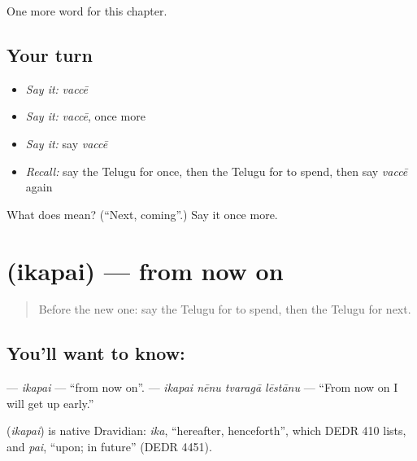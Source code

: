 \begin{grammarlens}[title={What you've built}]
One more word for this chapter.
\end{grammarlens}

\subsection*{Your turn}
\begin{itemize}
\raggedright
  \item \emph{Say it:} \emph{vaccē}
  \item \emph{Say it:} \emph{vaccē}, once more
  \item \emph{Say it:} say \emph{vaccē}
  \item \emph{Recall:} say the Telugu for once, then the Telugu for to spend, then say \emph{vaccē} again
\end{itemize}

\begin{tcolorbox}[breakable,colback=teal!4,colframe=teal!35!black,title={Before you move on}]
What does  mean? (\textquotedblleft{}Next, coming\textquotedblright{}.) Say it once more.
\end{tcolorbox}
\section[\texorpdfstring{\te{ఇకపై} (ikapai)}{ఇకపై (ikapai)}]{ (ikapai) — from now on}

\label{lesson:TE-C155-ikapai}



\begin{quote}
Before the new one: say the Telugu for to spend, then the Telugu for next.
\end{quote}

\subsection*{You'll want to know: }
\textbf{} — \emph{ikapai} — \textquotedblleft{}from now on\textquotedblright{}. \textbf{   } — \emph{ikapai nēnu tvaragā lēstānu} — \textquotedblleft{}From now on I will get up early.\textquotedblright{}

\begin{cousinweb}
\textbf{} (\emph{ikapai}) is native Dravidian: \emph{ika}, \textquotedblleft{}hereafter, henceforth\textquotedblright{}, which DEDR 410 lists, and \emph{pai}, \textquotedblleft{}upon; in future\textquotedblright{} (DEDR 4451).
\end{cousinweb}

